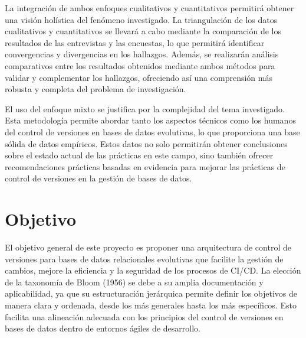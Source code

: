 \documentclass{IEEEtran}
\begin{document}
La integración de ambos enfoques cualitativos y cuantitativos permitirá obtener una visión holística del fenómeno investigado. La triangulación de los datos cualitativos y cuantitativos se llevará a cabo mediante la comparación de los resultados de las entrevistas y las encuestas, lo que permitirá identificar convergencias y divergencias en los hallazgos. Además, se realizarán análisis comparativos entre los resultados obtenidos mediante ambos métodos para validar y complementar los hallazgos, ofreciendo así una comprensión más robusta y completa del problema de investigación.

El uso del enfoque mixto se justifica por la complejidad del tema investigado. Esta metodología permite abordar tanto los aspectos técnicos como los humanos del control de versiones en bases de datos evolutivas, lo que proporciona una base sólida de datos empíricos. Estos datos no solo permitirán obtener conclusiones sobre el estado actual de las prácticas en este campo, sino también ofrecer recomendaciones prácticas basadas en evidencia para mejorar las prácticas de control de versiones en la gestión de bases de datos.




    
\section{Objetivo}
El objetivo general de este proyecto es proponer una arquitectura de control de versiones para bases de datos relacionales evolutivas que facilite la gestión de cambios, mejore la eficiencia y la seguridad de los procesos de CI/CD. La elección de la taxonomía de Bloom (1956) se debe a su amplia documentación y aplicabilidad, ya que su estructuración jerárquica permite definir los objetivos de manera clara y ordenada, desde los más generales hasta los más específicos. Esto facilita una alineación adecuada con los principios del control de versiones en bases de datos dentro de entornos ágiles de desarrollo.
\end{document}

